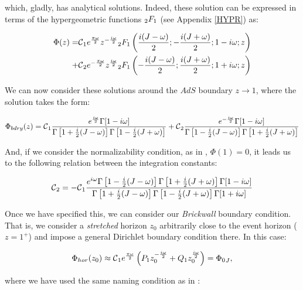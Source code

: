 \documentclass[11pt,a4paper]{article}
\begin{document}
which, gladly, has analytical solutions. Indeed, these solution can be expressed in terms of the hypergeometric functions ${}_2F_1$ (see Appendix \ref{HYPR}) as:

\begin{equation}\LA{SOL_BTZ}
    \begin{aligned}
        \Phi(z) = & \calc_1 e^{\frac{\pi\w}{2}} z^{-\frac{i\w}{2}}\hypr\left(\frac{i(J-\w)}{2};-\frac{i(J+\w)}{2};1-i\w;z\right) \\
    + & \calc_2 e^{-\frac{\pi\w}{2}} z^{\frac{i\w}{2}}\hypr\left(-\frac{i(J-\w)}{2};\frac{i(J+\w)}{2};1+i\w;z\right)
\end{aligned}
\end{equation}

We can now consider these solutions around the $AdS$ boundary $z\rightarrow 1$, where the solution takes the form:

\begin{equation}
    \Phi_{bdry}(z) = \mbox{${\cal C}$}_1\frac{e^{\frac{i\omega}{2}}\Gamma[1-i\omega]}{\Gamma\left[1+\frac{i}{2}(J-\omega)\right]\Gamma\left[1-\frac{i}{2}(J+\omega)\right]} + \mbox{${\cal C}$}_2\frac{e^{-\frac{i\omega}{2}}\Gamma[1-i\omega]}{\Gamma\left[1-\frac{i}{2}(J-\omega)\right]\Gamma\left[1+\frac{i}{2}(J+\omega)\right]}
\end{equation}

{\noindent And, if we consider the normalizability condition, as in \cite{Jeong_2025,Das_2023,das2023fuzzballsrandommatrices}, $\Phi(1)=0$, it leads us to the following relation between the integration constants:}

\begin{equation}
    \mbox{${\cal C}$}_2 = -\mbox{${\cal C}$}_1\frac{e^{i\omega}\Gamma\left[1-\frac{i}{2}(J-\omega)\right]\Gamma\left[1+\frac{i}{2}(J+\omega)\right]\Gamma[1-i\omega]}{\Gamma\left[1+\frac{i}{2}(J-\omega)\right]\Gamma\left[1-\frac{i}{2}(J+\omega)\right]\Gamma[1+i\omega]}
\end{equation}

Once we have specified this, we can consider our \textit{Brickwall} boundary condition. That is, we consider a \textit{stretched} horizon $z_0$ arbitrarily close to the event horizon ($z=1^+$) and impose a general Dirichlet boundary condition there. In this case:

\begin{equation}\LA{BOUNDARY_BTZ}
    \Phi_{hor}(z_0)\approx \calc_1 e^{\frac{\pi\w}{2}}\left(P_1 z_0^{-\frac{i\w}{2}}+Q_1 z_0^{\frac{i\w}{2}}\right) = {\Phi_0}_J,
\end{equation}

{\noindent where we have used the same naming condition as in \cite{Jeong_2025}:}
\end{document}
